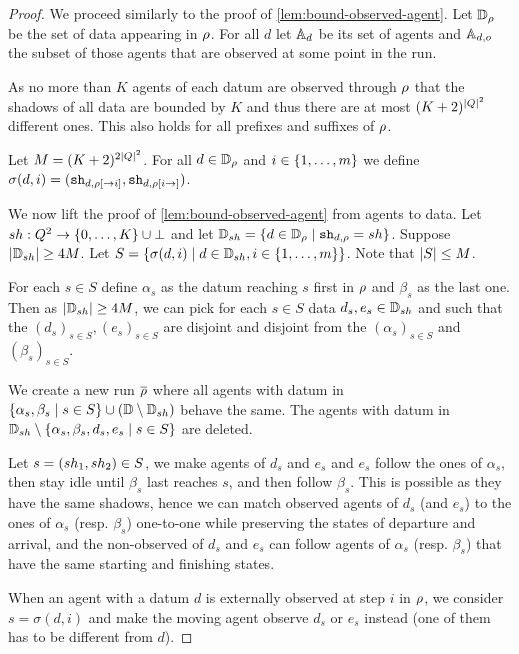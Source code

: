 \documentclass[a4paper,UKenglish,cleveref, autoref, thm-restate]{lipics-v2021}
\begin{document}
	 
	\begin{proof}
		We proceed similarly to the proof of \cref{lem:bound-observed-agent}. 
		Let $\mathbb{D}_\rho$ be the set of data appearing in $\rho$.
		For all $d$ let $\mathbb{A}_d$ be its set of agents and $\mathbb{A}_{d,o}$ the subset of those agents that are observed at some point in the run.
		
		As no more than $K$ agents of each datum are observed through $\rho$ that the shadows of all data are bounded by $K$ and thus there are at most $(K+2)^{|Q|^2}$ different ones. This also holds for all prefixes and suffixes of $\rho$.
		
		Let $M=(K+2)^{2|Q|^2}$. 
		For all $d \in \mathbb{D}_\rho$ and $i \in \{1,\dots,m\}$ we define $\sigma(d,i) = (\mathtt{sh}_{d,\rho[\to i]}, \mathtt{sh}_{d,\rho[i \to]})$. 
		
		We now lift the proof of \cref{lem:bound-observed-agent} from agents to data.
		Let $sh : Q^2 \to \{0,\dots,K\}\cup \bot$ and let $\mathbb{D}_{sh} = \{d \in \mathbb{D}_{\rho} \mid \mathtt{sh}_{d,\rho} = sh\}$. 
		Suppose $|\mathbb{D}_{sh}| \geq 4M$. 
		Let $S = \{\sigma(d,i) \mid d \in \mathbb{D}_{sh}, i\in\{1,\dots,m\}\}$. Note that $|S|\leq M$.
		
		For each $s \in S$ define $\alpha_s$ as the datum reaching $s$ first in $\rho$ and $\beta_s$ as the last one.
		Then as $|\mathbb{D}_{sh}|\geq 4M$, we can pick for each $s \in S$ data $d_s, e_s \in \mathbb{D}_{sh}$ and such that the $(d_s)_{s\in S}, (e_s)_{s\in S}$ are disjoint and disjoint from the $(\alpha_s)_{s\in S}$ and $(\beta_s)_{s\in S}$.
		
		We create a new run $\overline{\rho}$ where all agents with datum in $\{\alpha_s, \beta_s \mid s \in S\} \cup (\mathbb{D} \setminus \mathbb{D}_{sh})$ behave the same. 
		The agents with datum in $\mathbb{D}_{sh} \setminus \{\alpha_s, \beta_s, d_s, e_s \mid s \in S\}$ are deleted.
		
		Let $s = (sh_1, sh_2) \in S$, we make agents of $d_s$ and $e_s$ and $e_s$ follow the ones of $\alpha_s$, then stay idle until $\beta_s$ last reaches $s$, and then follow $\beta_s$.
		This is possible as they have the same shadows, hence we can match observed agents of $d_s$ (and $e_s$) to the ones of $\alpha_s$ (resp. $\beta_s$) one-to-one while preserving the states of departure and arrival, and the non-observed of $d_s$ and $e_s$ can follow agents of $\alpha_s$ (resp. $\beta_s$) that have the same starting and finishing states.
		
		When an agent with a datum $d$ is externally observed at step $i$ in $\rho$, we consider $s = \sigma(d,i)$ and make the moving agent observe $d_s$ or $e_s$ instead (one of them has to be different from $d$).
	\end{proof}
	
\end{document}

